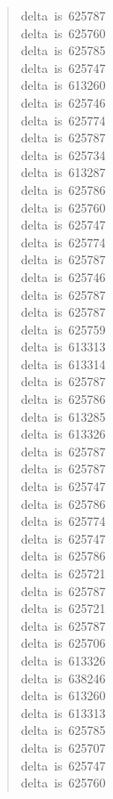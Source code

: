 \documentclass[letterpaper]{article}
\begin{document}
\begin{quote}
{delta~is~625787\\
delta~is~625760\\
delta~is~625785\\
delta~is~625747\\
delta~is~613260\\
delta~is~625746\\
delta~is~625774\\
delta~is~625787\\
delta~is~625734\\
delta~is~613287\\
delta~is~625786\\
delta~is~625760\\
delta~is~625747\\
delta~is~625774\\
delta~is~625787\\
delta~is~625746\\
delta~is~625787\\
delta~is~625787\\
delta~is~625759\\
delta~is~613313\\
delta~is~613314\\
delta~is~625787\\
delta~is~625786\\
delta~is~613285\\
delta~is~613326\\
delta~is~625787\\
delta~is~625787\\
delta~is~625747\\
delta~is~625786\\
delta~is~625774\\
delta~is~625747\\
delta~is~625786\\
delta~is~625721\\
delta~is~625787\\
delta~is~625721\\
delta~is~625787\\
delta~is~625706\\
delta~is~613326\\
delta~is~638246\\
delta~is~613260\\
delta~is~613313\\
delta~is~625785\\
delta~is~625707\\
delta~is~625747\\
delta~is~625760\\
}
\end{quote}
\end{document}
